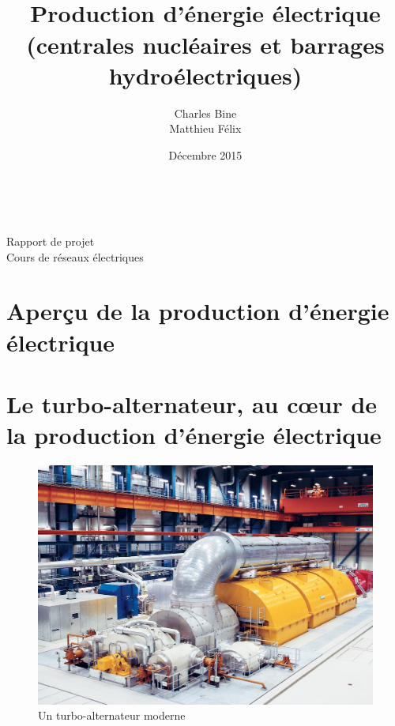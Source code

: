 \documentclass[12pt,a4paper,oneside,openany]{memoir}
\author{Charles Bine\\Matthieu Félix}
\title{\\Production d'énergie électrique (centrales nucléaires et barrages hydroélectriques)}
\date{Décembre 2015}
\begin{document}
	
\keepthetitle
\begin{titlingpage}
\noindent
\begin{minipage}[t]{0.5\textwidth} \begin{flushleft}
\theauthor \\ \thedate
\end{flushleft} \end{minipage}
\begin{minipage}[t]{0.5\textwidth} \begin{flushright}
Rapport de projet \\
Cours de réseaux électriques
\end{flushright} \end{minipage}

\vspace{3cm}
\begin{center}
{\LARGE \textbf{\thetitle}}
\end{center}
\vspace{3cm}

\end{titlingpage}

\addtolength{\marginparwidth}{11mm}
\abnormalparskip{4mm}

\clearpage

\tableofcontents

\clearpage

\chapter{Aperçu de la production d'énergie électrique}


\chapter{Le turbo-alternateur, au cœur de la production d'énergie électrique}

\begin{figure}
\centering
\includegraphics[width=0.95\linewidth]{Turbogenerator01}
\caption{Un turbo-alternateur moderne}
\label{fig:turbogenerator}
\end{figure}
\end{document}
